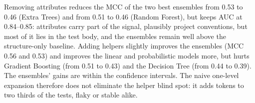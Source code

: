 Removing attributes reduces the MCC of the two best ensembles from 0.53 to 0.46 (Extra Trees) and from 0.51 to 0.46 (Random Forest), but keeps AUC at 0.84--0.85:  attributes carry part of the signal, plausibly project conventions, but most of it lies in the test body, and the ensembles remain well above the structure-only baseline. Adding helpers slightly improves the ensembles (MCC 0.56 and 0.53) and improves the linear and probabilistic models more, but hurts Gradient Boosting (from 0.51 to 0.43) and the Decision Tree (from 0.44 to 0.39).  The ensembles' gains are within the confidence intervals. The naive one-level expansion therefore does not eliminate the helper blind spot: it adds tokens to two thirds of the tests, flaky or stable alike.
